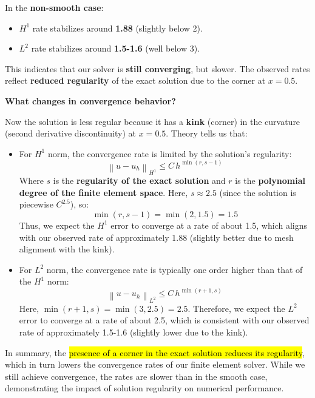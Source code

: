 \highspace
In the \textbf{non-smooth case}:
\begin{itemize}
    \item $H^{1}$ rate stabilizes around \textbf{1.88} (slightly below 2).
    \item $L^{2}$ rate stabilizes around \textbf{1.5-1.6} (well below 3).
\end{itemize}
This indicates that our solver is \textbf{still converging}, but slower. The observed rates reflect \textbf{reduced regularity} of the exact solution due to the corner at $x=0.5$.

\newpage

\begin{flushleft}
    \textcolor{Green3}{ \textbf{What changes in convergence behavior?}}
\end{flushleft}
Now the solution is less regular because it has a \textbf{kink} (corner) in the curvature (second derivative discontinuity) at $x=0.5$. Theory tells us that:
\begin{itemize}
    \item For $H^1$ norm, the convergence rate is limited by the solution's regularity:
    \begin{equation}
        \left\| u - u_h \right\|_{H^1} \le C \, h^{\min\left(r, s-1\right)}
    \end{equation}
    Where $s$ is the \textbf{regularity of the exact solution} and $r$ is the \textbf{polynomial degree of the finite element space}. Here, $s \approx 2.5$ (since the solution is piecewise $C^{2.5}$), so:
    \begin{equation*}
        \min\left(r, s-1\right) = \min\left(2, 1.5\right) = 1.5
    \end{equation*}
    Thus, we expect the $H^1$ error to converge at a rate of about 1.5, which aligns with our observed rate of approximately 1.88 (slightly better due to mesh alignment with the kink).

    \item For $L^2$ norm, the convergence rate is typically one order higher than that of the $H^1$ norm:
    \begin{equation}
        \left\| u - u_h \right\|_{L^2} \le C \, h^{\min\left(r+1, s\right)}
    \end{equation}
    Here, $\min\left(r+1, s\right) = \min\left(3, 2.5\right) = 2.5$. Therefore, we expect the $L^2$ error to converge at a rate of about 2.5, which is consistent with our observed rate of approximately 1.5-1.6 (slightly lower due to the kink).
\end{itemize}
In summary, the \hl{presence of a corner in the exact solution reduces its regularity}, which in turn lowers the convergence rates of our finite element solver. While we still achieve convergence, the rates are slower than in the smooth case, demonstrating the impact of solution regularity on numerical performance.

